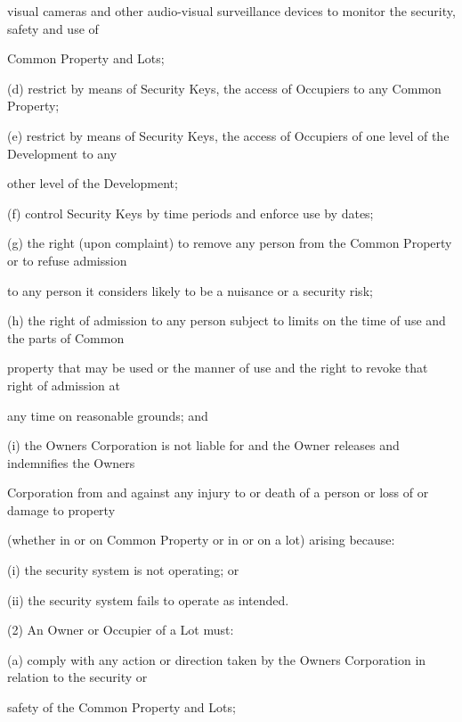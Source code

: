 \documentclass{article}
\begin{document}
{\fontsize{10.02}{1}visual cameras and other audio-visual surveillance devices to monitor the security, safety and use of }

{\fontsize{10.02}{1}Common Property and Lots; }

{\fontsize{9.962}{1}(d) restrict by means of Security Keys, the access of Occupiers to any Common Property; }

{\fontsize{9.962}{1}(e) restrict by means of Security Keys, the access of Occupiers of one level of the Development to any }

{\fontsize{10.02}{1}other level of the Development; }

\newpage

{\fontsize{9.962}{1}(f) control Security Keys by time periods and enforce use by dates; }

{\fontsize{9.962}{1}(g) the right (upon complaint) to remove any person from the Common Property or to refuse admission }

{\fontsize{10.02}{1}to any person it considers likely to be a nuisance or a security risk; }

{\fontsize{9.962}{1}(h) the right of admission to any person subject to limits on the time of use and the parts of Common }

{\fontsize{10.02}{1}property that may be used or the manner of use and the right to revoke that right of admission at }

{\fontsize{10.02}{1}any time on reasonable grounds; and }

{\fontsize{9.962}{1}(i) the Owners Corporation is not liable for and the Owner releases and indemnifies the Owners }

{\fontsize{10.02}{1}Corporation from and against any injury to or death of a person or loss of or damage to property }

{\fontsize{10.02}{1}(whether in or on Common Property or in or on a lot) arising because: }

{\fontsize{9.962}{1}(i) the security system is not operating; or }

{\fontsize{9.962}{1}(ii) the security system fails to operate as intended. }

{\fontsize{9.962}{1}(2) An Owner or Occupier of a Lot must: }

{\fontsize{9.962}{1}(a) comply with any action or direction taken by the Owners Corporation in relation to the security or }

{\fontsize{10.02}{1}safety of the Common Property and Lots; }
\end{document}
